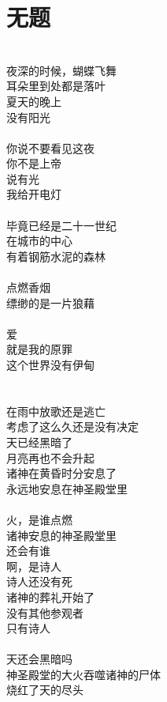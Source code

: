 \chapter[无题]{无\qquad 题}

\leftskip=20mm
\noindent
{}
\\
夜深的时候，蝴蝶飞舞\\
耳朵里到处都是落叶\\
夏天的晚上\\
没有阳光\\
\\
你说不要看见这夜\\
你不是上帝\\
说有光\\
我给开电灯\\
\\
毕竟已经是二十一世纪\\
在城市的中心\\
有着钢筋水泥的森林\\
\\
点燃香烟\\
缥缈的是一片狼藉\\
\\
爱\\
就是我的原罪\\
这个世界没有伊甸\\
\\
\\
在雨中放歌还是逃亡\\
考虑了这么久还是没有决定\\
天已经黑暗了\\
月亮再也不会升起\\
诸神在黄昏时分安息了\\
永远地安息在神圣殿堂里\\
\\
火，是谁点燃\\
诸神安息的神圣殿堂里\\
还会有谁\\
啊，是诗人\\
诗人还没有死\\
诸神的葬礼开始了\\
没有其他参观者\\
只有诗人\\
\\
天还会黑暗吗\\
神圣殿堂的大火吞噬诸神的尸体\\
烧红了天的尽头\\
